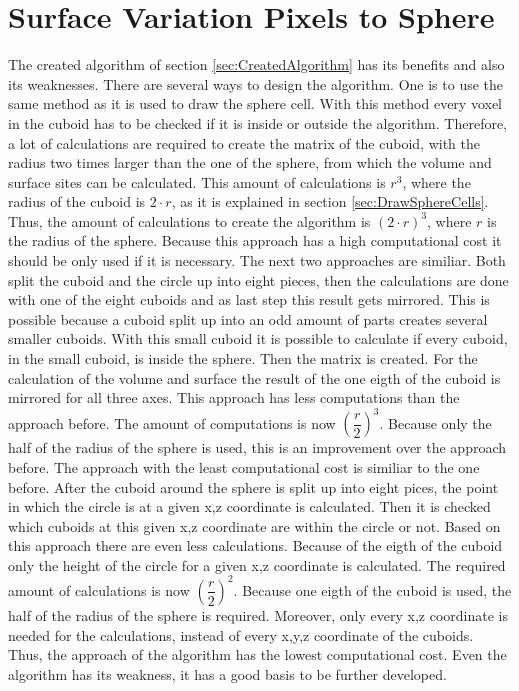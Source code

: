 \section{Surface Variation Pixels to Sphere}
The created algorithm of section \ref{sec:CreatedAlgorithm} has its benefits and also its weaknesses. There are several ways to design the algorithm. One is to use the same method as it is used to draw the sphere cell. With this method every voxel in the cuboid has to be checked if it is inside or outside the algorithm. Therefore, a lot of calculations are required to create the matrix of the cuboid, with the radius two times larger than the one of the sphere, from which the volume and surface sites can be calculated. This amount of calculations is $r^{3}$, where the radius of the cuboid is $2 \cdot r$, as it is explained in section \ref{sec:DrawSphereCells}. Thus, the amount of calculations to create the algorithm is $(2 \cdot r)^{3}$, where $r$ is the radius of the sphere. Because this approach has a high computational cost it should be only used if it is necessary. \newline
The next two approaches are similiar. Both split the cuboid and the circle up into eight pieces, then the calculations are done with one of the eight cuboids and as last step this result gets mirrored. This is possible because a cuboid split up into an odd amount of parts creates several smaller cuboids. With this small cuboid it is possible to calculate if every cuboid, in the small cuboid, is inside the sphere. Then the matrix is created. For the calculation of the volume and surface the result of the one eigth of the cuboid is mirrored for all three axes. This approach has less computations than the approach before. The amount of computations is now $(\dfrac{r}{2})^{3}$. Because only the half of the radius of the sphere is used, this is an improvement over the approach before. \newline
The approach with the least computational cost is similiar to the one before. After the cuboid around the sphere is split up into eight pices, the point in which the circle is at a given x,z coordinate is calculated. Then it is checked which cuboids at this given x,z coordinate are within the circle or not. Based on this approach there are even less calculations. Because of the eigth of the cuboid only the height of the circle for a given x,z coordinate is calculated. The required amount of calculations is now $(\dfrac{r}{2})^{2}$. Because one eigth of the cuboid is used, the half of the radius of the sphere is required. Moreover, only every x,z coordinate is needed for the calculations, instead of every x,y,z coordinate of the cuboids. Thus, the approach of the algorithm has the lowest computational cost. Even the algorithm has its weakness, it has a good basis to be further developed.

